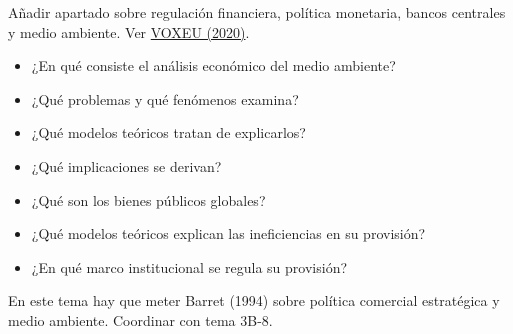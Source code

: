 \documentclass{nuevotema}
\begin{document}
\ideaclave

Añadir apartado sobre regulación financiera, política monetaria, bancos centrales y medio ambiente. Ver \href{https://voxeu.org/article/central-banks-and-climate-change}{VOXEU (2020)}.

\begin{itemize}
	\item ¿En qué consiste el análisis económico del medio ambiente?
	\item ¿Qué problemas y qué fenómenos examina?
	\item ¿Qué modelos teóricos tratan de explicarlos?
	\item ¿Qué implicaciones se derivan?
	\item ¿Qué son los bienes públicos globales?
	\item ¿Qué modelos teóricos explican las ineficiencias en su provisión?
	\item ¿En qué marco institucional se regula su provisión?
\end{itemize}

En este tema hay que meter Barret (1994) sobre política comercial estratégica y medio ambiente. Coordinar con tema 3B-8.

\esquemacorto
\end{document}
